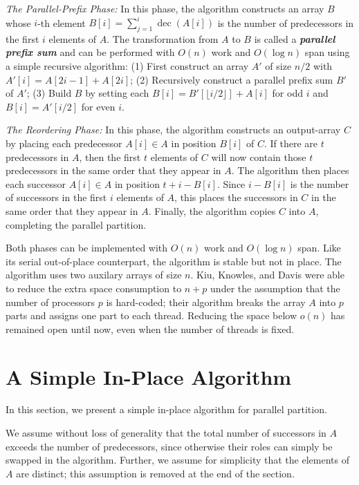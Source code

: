 \documentclass[sigplan, twocolumn]{amsart}
\newcommand{\defn}[1]       {{\textit{\textbf{\boldmath #1}}}}
\newcommand{\dec}{\operatorname{dec}}
\theoremstyle{remark}
\theoremstyle{remark}
\begin{document}
\noindent\emph{The Parallel-Prefix Phase: }In this phase, the algorithm
constructs an array $B$ whose $i$-th element $B[i] = \sum_{j = 1}^i
\dec(A[i])$ is the number of predecessors in the first $i$ elements of
$A$. The transformation from $A$ to $B$ is called a \defn{parallel
  prefix sum} and can be performed with $O(n)$ work and $O(\log n)$
span using a simple recursive algorithm: (1) First construct an array
$A'$ of size $n / 2$ with $A'[i] = A[2i - 1] + A[2i]$; (2)
Recursively construct a parallel prefix sum $B'$ of $A'$; (3) Build
$B$ by setting each $B[i] = B'[\lfloor i / 2 \rfloor] + A[i]$ for odd
$i$ and $B[i] = A'[i / 2]$ for even $i$. 

\noindent\emph{The Reordering Phase: }In this phase, the algorithm
constructs an output-array $C$ by placing each predecessor $A[i] \in A$
in position $B[i]$ of $C$. If there are $t$ predecessors in $A$, then
the first $t$ elements of $C$ will now contain those $t$ predecessors
in the same order that they appear in $A$. The algorithm then places
each successor $A[i] \in A$ in position $t + i - B[i]$. Since $i - B[i]$
is the number of successors in the first $i$ elements of $A$, this
places the successors in $C$ in the same order that they appear in
$A$. Finally, the algorithm copies $C$ into $A$, completing the
parallel partition.

Both phases can be implemented with $O(n)$ work and $O(\log n)$
span. Like its serial out-of-place counterpart, the algorithm is
stable but not in place. The algorithm uses two auxilary arrays of
size $n$. Kiu, Knowles, and Davis \cite{LiuKn05} were able to reduce
the extra space consumption to $n + p$ under the assumption that the
number of processors $p$ is hard-coded; their algorithm breaks the
array $A$ into $p$ parts and assigns one part to each thread. Reducing
the space below $o(n)$ has remained open until now, even when the
number of threads is fixed.

\section{A Simple In-Place Algorithm}\label{secalg}

In this section, we present a simple in-place algorithm for parallel
partition. 

We assume without loss of generality that the total number of
successors in $A$ exceeds the number of predecessors, since otherwise
their roles can simply be swapped in the algorithm. Further, we assume
for simplicity that the elements of $A$ are distinct; this assumption
is removed at the end of the section.
\end{document}
